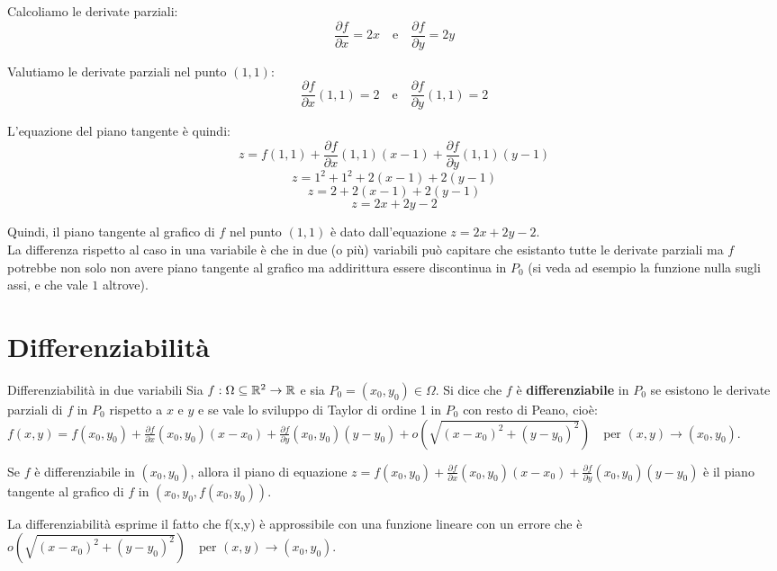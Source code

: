 Calcoliamo le derivate parziali:
\[
\frac{\partial f}{\partial x} = 2x \quad \text{e} \quad \frac{\partial f}{\partial y} = 2y
\]

Valutiamo le derivate parziali nel punto $(1,1)$:
\[
\frac{\partial f}{\partial x}(1,1) = 2 \quad \text{e} \quad \frac{\partial f}{\partial y}(1,1) = 2
\]

L'equazione del piano tangente è quindi:
\[
z = f(1,1) + \frac{\partial f}{\partial x}(1,1)(x-1) + \frac{\partial f}{\partial y}(1,1)(y-1)
\]
\[
z = 1^2 + 1^2 + 2(x-1) + 2(y-1)
\]
\[
z = 2 + 2(x-1) + 2(y-1)
\]
\[
z = 2x + 2y - 2
\]

Quindi, il piano tangente al grafico di $f$ nel punto $(1,1)$ è dato dall'equazione $z = 2x + 2y - 2$.\\


La differenza rispetto al caso in una variabile è che in due (o più) variabili può capitare che esistanto tutte le derivate parziali ma $f$ potrebbe non solo non avere piano tangente al grafico ma addirittura essere discontinua in $P_0$ (si veda ad esempio la funzione nulla sugli assi, e che vale $1$ altrove).

\section{Differenziabilità}
\begin{definizione}{Differenziabilità in due variabili}
Sia $f:\Omega \subseteq \mathbb{R}^2 \rightarrow \mathbb{R}$ e sia $P_0 = (x_0,y_0) \in \Omega$. Si dice che $f$ è \textbf{differenziabile} in $P_0$ se esistono le derivate parziali di $f$ in $P_0$ rispetto a $x$ e $y$ e se vale lo sviluppo di Taylor di ordine 1 in $P_0$ con resto di Peano, cioè: $f(x,y)=f(x_0,y_0)+\frac{\partial f}{\partial x}(x_0,y_0)(x-x_0)+\frac{\partial f}{\partial y}(x_0,y_0)(y-y_0)+o(\sqrt{(x-x_0)^2+(y-y_0)^2}) \quad \text{per }(x,y) \rightarrow (x_0,y_0)$.
\end{definizione}

\begin{osservazione}{}
Se $f$ è differenziabile in $(x_0,y_0)$, allora il piano di equazione $z=f(x_0,y_0)+\frac{\partial f}{\partial x}(x_0,y_0)(x-x_0)+\frac{\partial f}{\partial y}(x_0,y_0)(y-y_0)$ è il piano tangente al grafico di $f$ in $(x_0,y_0,f(x_0,y_0))$.
\end{osservazione}
\begin{osservazione}{}
  La differenziabilità esprime il fatto che f(x,y) è approssibile con una funzione lineare con un errore che è $o(\sqrt{(x-x_0)^2+(y-y_0)^2}) \quad \text{per }(x,y) \rightarrow (x_0,y_0)$.
\end{osservazione}

